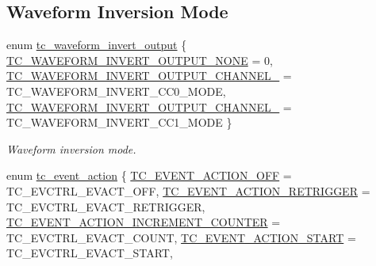 \subsection*{Waveform Inversion Mode}
\begin{DoxyCompactItemize}
\item 
enum \mbox{\hyperlink{group__asfdoc__sam0__tc__group_gaf681729d6b5f963705871f7d80754166}{tc\+\_\+waveform\+\_\+invert\+\_\+output}} \{ \mbox{\hyperlink{group__asfdoc__sam0__tc__group_ggaf681729d6b5f963705871f7d80754166a292cfce35b768eecd69f2a4320aaa96b}{T\+C\+\_\+\+W\+A\+V\+E\+F\+O\+R\+M\+\_\+\+I\+N\+V\+E\+R\+T\+\_\+\+O\+U\+T\+P\+U\+T\+\_\+\+N\+O\+NE}} = 0, 
\mbox{\hyperlink{group__asfdoc__sam0__tc__group_ggaf681729d6b5f963705871f7d80754166af3ebe1706d0f442c6388619bc3d9fa58}{T\+C\+\_\+\+W\+A\+V\+E\+F\+O\+R\+M\+\_\+\+I\+N\+V\+E\+R\+T\+\_\+\+O\+U\+T\+P\+U\+T\+\_\+\+C\+H\+A\+N\+N\+E\+L\+\_}} = T\+C\+\_\+\+W\+A\+V\+E\+F\+O\+R\+M\+\_\+\+I\+N\+V\+E\+R\+T\+\_\+\+C\+C0\+\_\+\+M\+O\+DE, 
\mbox{\hyperlink{group__asfdoc__sam0__tc__group_ggaf681729d6b5f963705871f7d80754166a97327e36339fbad207e7150d6ba7b283}{T\+C\+\_\+\+W\+A\+V\+E\+F\+O\+R\+M\+\_\+\+I\+N\+V\+E\+R\+T\+\_\+\+O\+U\+T\+P\+U\+T\+\_\+\+C\+H\+A\+N\+N\+E\+L\+\_}} = T\+C\+\_\+\+W\+A\+V\+E\+F\+O\+R\+M\+\_\+\+I\+N\+V\+E\+R\+T\+\_\+\+C\+C1\+\_\+\+M\+O\+DE
 \}
\begin{DoxyCompactList}\small\item\em Waveform inversion mode. \end{DoxyCompactList}\item 
enum \mbox{\hyperlink{group__asfdoc__sam0__tc__group_ga4dcbf6cdb74bc3b7609ce8d16549462f}{tc\+\_\+event\+\_\+action}} \{ \newline
\mbox{\hyperlink{group__asfdoc__sam0__tc__group_gga4dcbf6cdb74bc3b7609ce8d16549462fa190e10df25f3f6a6c781cc751eb3489e}{T\+C\+\_\+\+E\+V\+E\+N\+T\+\_\+\+A\+C\+T\+I\+O\+N\+\_\+\+O\+FF}} = T\+C\+\_\+\+E\+V\+C\+T\+R\+L\+\_\+\+E\+V\+A\+C\+T\+\_\+\+O\+FF, 
\mbox{\hyperlink{group__asfdoc__sam0__tc__group_gga4dcbf6cdb74bc3b7609ce8d16549462fa9696961ae81b1aba22582d8a35bdf14d}{T\+C\+\_\+\+E\+V\+E\+N\+T\+\_\+\+A\+C\+T\+I\+O\+N\+\_\+\+R\+E\+T\+R\+I\+G\+G\+ER}} = T\+C\+\_\+\+E\+V\+C\+T\+R\+L\+\_\+\+E\+V\+A\+C\+T\+\_\+\+R\+E\+T\+R\+I\+G\+G\+ER, 
\mbox{\hyperlink{group__asfdoc__sam0__tc__group_gga4dcbf6cdb74bc3b7609ce8d16549462fa07b969496782cb311ddb13cfafb36aff}{T\+C\+\_\+\+E\+V\+E\+N\+T\+\_\+\+A\+C\+T\+I\+O\+N\+\_\+\+I\+N\+C\+R\+E\+M\+E\+N\+T\+\_\+\+C\+O\+U\+N\+T\+ER}} = T\+C\+\_\+\+E\+V\+C\+T\+R\+L\+\_\+\+E\+V\+A\+C\+T\+\_\+\+C\+O\+U\+NT, 
\mbox{\hyperlink{group__asfdoc__sam0__tc__group_gga4dcbf6cdb74bc3b7609ce8d16549462fac06c64382b572d0464138ae51b7876df}{T\+C\+\_\+\+E\+V\+E\+N\+T\+\_\+\+A\+C\+T\+I\+O\+N\+\_\+\+S\+T\+A\+RT}} = T\+C\+\_\+\+E\+V\+C\+T\+R\+L\+\_\+\+E\+V\+A\+C\+T\+\_\+\+S\+T\+A\+RT, 

\end{DoxyCompactItemize}

